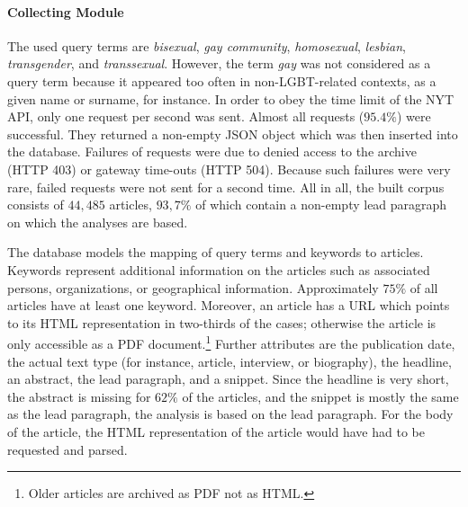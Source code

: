 \documentclass[10pt,a4paper,twocolumn]{scrartcl}
\begin{document}
\paragraph*{Collecting Module} The used query terms are \textit{bisexual}, \textit{gay community}, \textit{homosexual}, \textit{lesbian}, \textit{transgender}, and \textit{transsexual}. However, the term \textit{gay} was not considered as a query term because it appeared too often in non-LGBT-related contexts, as a given name or surname, for instance. In order to obey the time limit of the NYT API, only one request per second was sent. Almost all requests ($95.4\%$) were successful. They returned a non-empty JSON object which was then inserted into the database. Failures of requests were due to denied access to the archive (HTTP 403) or gateway time-outs (HTTP 504). Because such failures were very rare, failed requests were not sent for a second time. All in all, the built corpus consists of $44,485$ articles, $93,7\%$ of which contain a non-empty lead paragraph on which the analyses are based.

The database models the mapping of query terms and keywords to articles. Keywords represent additional information on the articles such as associated persons, organizations, or geographical information. Approximately $75\%$ of all articles have at least one keyword. Moreover, an article has a URL which points to its HTML representation in two-thirds of the cases; otherwise the article is only accessible as a PDF document.\footnote{Older articles are archived as PDF not as HTML.} Further attributes are the publication date, the actual text type (for instance, article, interview, or biography), the headline, an abstract, the lead paragraph, and a snippet. Since the headline is very short, the abstract is missing for $62\%$ of the articles, and the snippet is mostly the same as the lead paragraph, the analysis is based on the lead paragraph. For the body of the article, the HTML representation of the article would have had to be requested and parsed.
\end{document}
